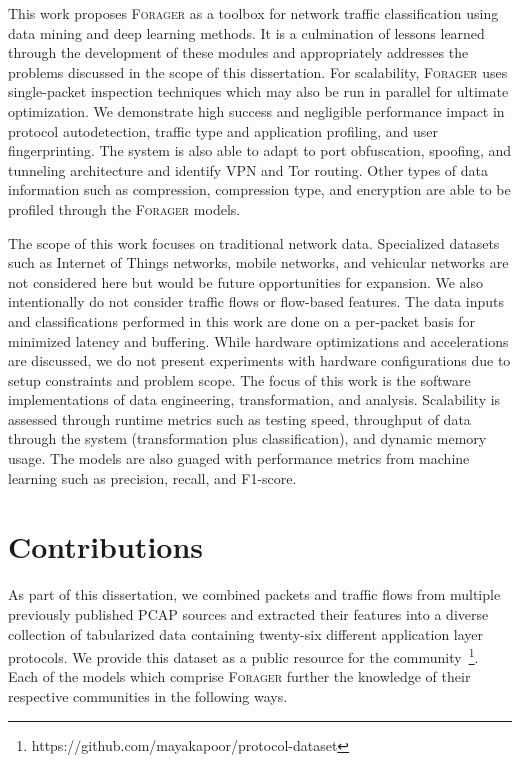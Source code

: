 This work proposes \textsc{Forager} as a toolbox for network traffic classification using data mining and deep learning methods. It is a culmination of lessons learned through the development of these modules and appropriately addresses the problems discussed in the scope of this dissertation. For scalability, \textsc{Forager} uses single-packet inspection techniques which may also be run in parallel for ultimate optimization. We demonstrate high success and negligible performance impact in protocol autodetection, traffic type and application profiling, and user fingerprinting. The system is also able to adapt to port obfuscation, spoofing, and tunneling architecture and identify VPN and Tor routing. Other types of data information such as compression, compression type, and encryption are able to be profiled through the \textsc{Forager} models.

The scope of this work focuses on traditional network data. Specialized datasets such as Internet of Things networks, mobile networks, and vehicular networks are not considered here but would be future opportunities for expansion. We also intentionally do not consider traffic flows or flow-based features. The data inputs and classifications performed in this work are done on a per-packet basis for minimized latency and buffering. While hardware optimizations and accelerations are discussed, we do not present experiments with hardware configurations due to setup constraints and problem scope. The focus of this work is the software implementations of data engineering, transformation, and analysis. Scalability is assessed through runtime metrics such as testing speed, throughput of data through the system (transformation plus classification), and dynamic memory usage. The models are also guaged with performance metrics from machine learning such as precision, recall, and F1-score.

\section{Contributions}

As part of this dissertation, we combined packets and traffic flows from multiple previously published PCAP sources and extracted their features into a diverse collection of tabularized data containing twenty-six different application layer protocols. We provide this dataset as a public resource for the community~\footnote{https://github.com/mayakapoor/protocol-dataset}. Each of the models which comprise \textsc{Forager} further the knowledge of their respective communities in the following ways.

